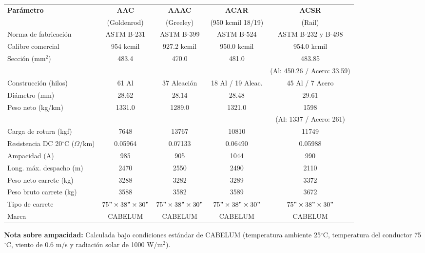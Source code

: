 \documentclass[12pt,a4paper]{article}
\begin{document}
\begin{landscape}
\begin{center}
\begin{tabular}{p{4cm}c|c|c|c}
\toprule
\textbf{Parámetro} & \textbf{AAC} & \textbf{AAAC} & \textbf{ACAR} & \textbf{ACSR} \\
& (Goldenrod) & (Greeley) & (950 kcmil 18/19) & (Rail) \\
\midrule
Norma de fabricación & ASTM B-231 & ASTM B-399 & ASTM B-524 & ASTM B-232 y B-498 \\
\midrule
Calibre comercial & 954 kcmil & 927.2 kcmil & 950.0 kcmil & 954.0 kcmil \\
\midrule
Sección (mm$^2$) & 483.4 & 470.0 & 481.0 & 483.85 \\
& & & & (Al: 450.26 / Acero: 33.59) \\
\midrule
Construcción (hilos) & 61 Al & 37 Aleación & 18 Al / 19 Aleac. & 45 Al / 7 Acero \\
\midrule
Diámetro (mm) & 28.62 & 28.14 & 28.48 & 29.61 \\
\midrule
Peso neto (kg/km) & 1331.0 & 1289.0 & 1321.0 & 1598 \\
& & & & (Al: 1337 / Acero: 261) \\
\midrule
Carga de rotura (kgf) & 7648 & 13767 & 10810 & 11749 \\
\midrule
Resistencia DC 20$^\circ$C ($\Omega$/km) & 0.05964 & 0.07133 & 0.06490 & 0.05988 \\
\midrule
Ampacidad (A) & 985 & 905 & 1044 & 990 \\
\midrule
Long. máx. despacho (m) & 2470 & 2550 & 2490 & 2110 \\
\midrule
Peso neto carrete (kg) & 3288 & 3282 & 3289 & 3372 \\
\midrule
Peso bruto carrete (kg) & 3588 & 3582 & 3589 & 3672 \\
\midrule
Tipo de carrete & $75"\times38"\times30"$ & $75"\times38"\times30"$ & $75"\times38"\times30"$ & $75"\times38"\times30"$ \\
\midrule
Marca & CABELUM & CABELUM & CABELUM & CABELUM \\
\bottomrule
\end{tabular}
\end{center}

\vspace{0.3cm}
\textbf{Nota sobre ampacidad:} Calculada bajo condiciones estándar de CABELUM
(temperatura ambiente 25$^\circ$C, temperatura del conductor 75$^\circ$C,
viento de 0.6 m/s y radiación solar de 1000 W/m$^2$).
\end{landscape}
\end{document}
